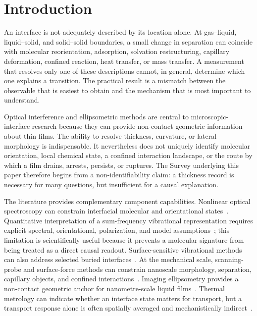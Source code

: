 \documentclass[conference]{IEEEtran}
\begin{document}
\section{Introduction}

An interface is not adequately described by its location alone. At gas--liquid, liquid--solid, and solid--solid boundaries, a small change in separation can coincide with molecular reorientation, adsorption, solvation restructuring, capillary deformation, confined reaction, heat transfer, or mass transfer. A measurement that resolves only one of these descriptions cannot, in general, determine which one explains a transition. The practical result is a mismatch between the observable that is easiest to obtain and the mechanism that is most important to understand.

Optical interference and ellipsometric methods are central to microscopic-interface research because they can provide non-contact geometric information about thin films. The ability to resolve thickness, curvature, or lateral morphology is indispensable. It nevertheless does not uniquely identify molecular orientation, local chemical state, a confined interaction landscape, or the route by which a film drains, arrests, persists, or ruptures. The Survey underlying this paper therefore begins from a non-identifiability claim: a thickness record is necessary for many questions, but insufficient for a causal explanation.

The literature provides complementary component capabilities. Nonlinear optical spectroscopy can constrain interfacial molecular and orientational states~\cite{backus2020,tang2020}. Quantitative interpretation of a sum-frequency vibrational representation requires explicit spectral, orientational, polarization, and model assumptions~\cite{wang2005}; this limitation is scientifically useful because it prevents a molecular signature from being treated as a direct causal readout. Surface-sensitive vibrational methods can also address selected buried interfaces~\cite{chen2010}. At the mechanical scale, scanning-probe and surface-force methods can constrain nanoscale morphology, separation, capillary objects, and confined interactions~\cite{lohse2015,dziadkowiec2019}. Imaging ellipsometry provides a non-contact geometric anchor for nanometre-scale liquid films~\cite{shoji2024}. Thermal metrology can indicate whether an interface state matters for transport, but a transport response alone is often spatially averaged and mechanistically indirect~\cite{cahill2003}.
\end{document}
